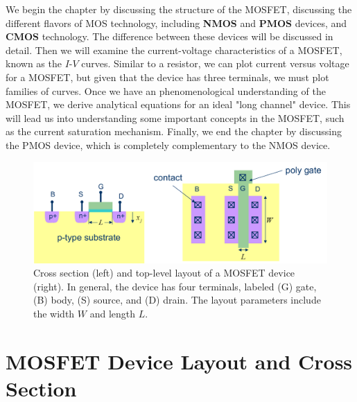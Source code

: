 We begin the chapter by discussing the structure of the MOSFET, discussing the different flavors of MOS technology, including \textbf{NMOS} and \textbf{PMOS} devices, and \textbf{CMOS} technology.  The difference between these devices will be discussed in detail.  Then we will examine the current-voltage characteristics of a MOSFET, known as the $I$-$V$ curves.  Similar to a resistor, we can plot current versus voltage for a MOSFET, but given that the device has three terminals, we must plot families of curves.  Once we have an phenomenological understanding of the MOSFET, we derive analytical equations for an ideal "long channel" device.  This will lead us into understanding some important concepts in the MOSFET, such as the current saturation mechanism.  Finally, we end the chapter by discussing the PMOS device, which is completely complementary to the NMOS device.
\newpage
\begin{figure}[t]
\centering
\includegraphics[width=.95\columnwidth]{mosfet_layout}
\caption{Cross section (left) and top-level layout of a MOSFET device (right).  In general, the device has four terminals, labeled (G) gate, (B) body, (S) source, and (D) drain.  The layout parameters include the width $W$ and length $L$.}
\label{fig:mosfet_layout}
\end{figure}
\section{MOSFET Device Layout and Cross Section}
